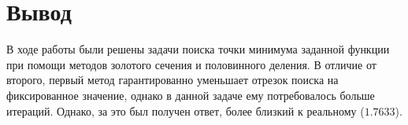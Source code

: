 \documentclass[a4paper,12pt]{article}
\begin{document}
	\section{Вывод}
	В ходе работы были решены задачи поиска точки минимума заданной функции при помощи методов золотого сечения
	и половинного деления. В отличие от второго, первый метод гарантированно уменьшает отрезок поиска на
	фиксированное значение, однако в данной задаче ему потребовалось больше итераций. Однако, за это был получен
	ответ, более близкий к реальному ($1.7633$).
\end{document}
